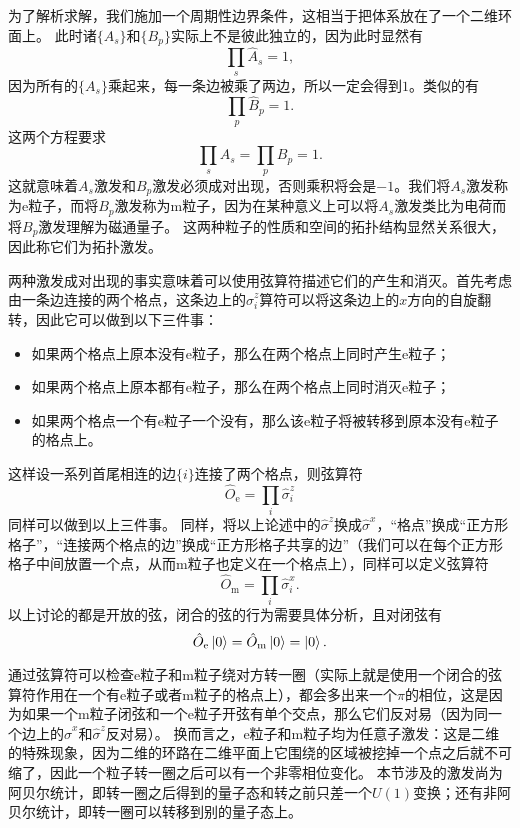 \documentclass[hyperref, UTF8, a4paper]{ctexart}
\begin{document}
为了解析求解，我们施加一个周期性边界条件，这相当于把体系放在了一个二维环面上。
此时诸$\{A_s\}$和$\{B_p\}$实际上不是彼此独立的，因为此时显然有
\[
    \prod_s \hat{A}_s = 1,
\]
因为所有的$\{A_s\}$乘起来，每一条边被乘了两边，所以一定会得到$1$。类似的有
\[
    \prod_p \hat{B}_p = 1.
\]
这两个方程要求
\begin{equation}
    \prod_{s} A_s = \prod_{p} B_p = 1.
    \label{eq:toric-code-pair-condition}
\end{equation}
这就意味着$A_s$激发和$B_p$激发必须成对出现，否则乘积将会是$-1$。我们将$A_s$激发称为e粒子，而将$B_p$激发称为m粒子，因为在某种意义上可以将$A_s$激发类比为电荷而将$B_p$激发理解为磁通量子。
这两种粒子的性质和空间的拓扑结构显然关系很大，因此称它们为拓扑激发。

两种激发成对出现的事实意味着可以使用弦算符描述它们的产生和消灭。首先考虑由一条边连接的两个格点，这条边上的$\hat{\sigma}^z_i$算符可以将这条边上的$x$方向的自旋翻转，因此它可以做到以下三件事：
\begin{itemize}
    \item 如果两个格点上原本没有e粒子，那么在两个格点上同时产生e粒子；
    \item 如果两个格点上原本都有e粒子，那么在两个格点上同时消灭e粒子； 
    \item 如果两个格点一个有e粒子一个没有，那么该e粒子将被转移到原本没有e粒子的格点上。
\end{itemize}
这样设一系列首尾相连的边$\{i\}$连接了两个格点，则弦算符
\begin{equation}
    \hat{O}_\text{e} = \prod_{i} \hat{\sigma}_i^z
\end{equation}
同样可以做到以上三件事。
同样，将以上论述中的$\hat{\sigma}^z$换成$\hat{\sigma}^x$，“格点”换成“正方形格子”，“连接两个格点的边”换成“正方形格子共享的边”（我们可以在每个正方形格子中间放置一个点，从而m粒子也定义在一个格点上），同样可以定义弦算符
\begin{equation}
    \hat{O}_\text{m} = \prod_{i} \hat{\sigma}_i^x.
\end{equation}
以上讨论的都是开放的弦，闭合的弦的行为需要具体分析，且对闭弦有
\begin{equation}
    \hat{O}_\text{e} \ket{0} = \hat{O}_\text{m} \ket{0} = \ket{0}.
\end{equation}

通过弦算符可以检查e粒子和m粒子绕对方转一圈（实际上就是使用一个闭合的弦算符作用在一个有e粒子或者m粒子的格点上），都会多出来一个$\pi$的相位，这是因为如果一个m粒子闭弦和一个e粒子开弦有单个交点，那么它们反对易（因为同一个边上的$\hat{\sigma}^x$和$\hat{\sigma}^z$反对易）。
换而言之，e粒子和m粒子均为任意子激发：这是二维的特殊现象，因为二维的环路在二维平面上它围绕的区域被挖掉一个点之后就不可缩了，因此一个粒子转一圈之后可以有一个非零相位变化。
本节涉及的激发尚为阿贝尔统计，即转一圈之后得到的量子态和转之前只差一个$U(1)$变换；还有非阿贝尔统计，即转一圈可以转移到别的量子态上。
\end{document}
